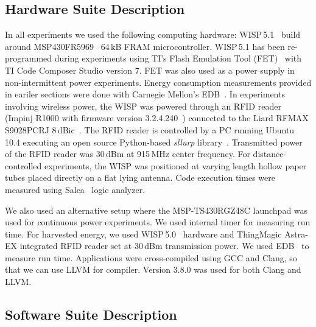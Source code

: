 
\subsection{Hardware Suite Description}
\label{sec:results_hardware}

In all experiments we used the following computing hardware: WISP\,5.1~\cite{wisp5,wisp} build around MSP430FR5969~\cite{wolverine} 64\,kB FRAM microcontroller. WISP\,5.1 has been re-programmed during experiments using TI's Flash Emulation Tool (FET)~\cite{fet} with TI Code Composer Studio version 7. FET was also used as a power supply in non-intermittent power experiments. Energy consumption measurements provided in eariler sections were done with Carnegie Mellon's EDB~\cite{edb}. In experiments involving wireless power, the WISP was powered through an RFID reader (Impinj R1000 with firmware version 3.2.4.240~\cite{r1000_data_sheet}) connected to the Liard RFMAX S9028PCRJ 8\,dBic~\cite{atlas2015}. The RFID reader is controlled by a PC running Ubuntu 10.4 executing an open source Python-based \emph{sllurp} library~\cite{sllrp_github}. Transmitted power of the RFID reader was 30\,dBm at 915\,MHz center frequency. For distance-controlled experiments, the WISP was positioned at varying length hollow paper tubes placed directly on a flat lying antenna. Code execution times were measured using Salea~\cite{saleae} logic analyzer.

We also used an alternative setup where the MSP-TS430RGZ48C launchpad was used for continuous power experiments. We used internal timer for measuring run time. For harvested energy, we used WISP\,5.0~\cite{wisp5,wisp} hardware and ThingMagic Astra-EX integrated RFID reader set at 30\,dBm transmission power. We used EDB~\cite{edb} to measure run time. Applications were cross-compiled using GCC and Clang, so that we can use LLVM for \sys compiler. Version 3.8.0 was used for both Clang and LLVM.

\subsection{Software Suite Description}
\label{sec:results_software}

